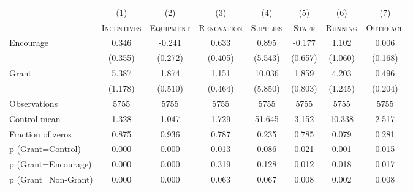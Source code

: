 \begin{tabular*}{\hsize}{@{\hskip\tabcolsep\extracolsep\fill}l*{7}{c}}
\toprule
                    &\multicolumn{1}{c}{(1)}&\multicolumn{1}{c}{(2)}&\multicolumn{1}{c}{(3)}&\multicolumn{1}{c}{(4)}&\multicolumn{1}{c}{(5)}&\multicolumn{1}{c}{(6)}&\multicolumn{1}{c}{(7)}\\
                    &\multicolumn{1}{c}{\textsc{Incentives}}&\multicolumn{1}{c}{\textsc{Equipment}}&\multicolumn{1}{c}{\textsc{Renovation}}&\multicolumn{1}{c}{\textsc{Supplies}}&\multicolumn{1}{c}{\textsc{Staff}}&\multicolumn{1}{c}{\textsc{Running}}&\multicolumn{1}{c}{\textsc{Outreach}}\\
\midrule
Encourage           &       0.346&      -0.241&       0.633&       0.895&      -0.177&       1.102&       0.006\\
                    &     (0.355)&     (0.272)&     (0.405)&     (5.543)&     (0.657)&     (1.060)&     (0.168)\\
\addlinespace
Grant               &       5.387&       1.874&       1.151&      10.036&       1.859&       4.203&       0.496\\
                    &     (1.178)&     (0.510)&     (0.464)&     (5.850)&     (0.803)&     (1.245)&     (0.204)\\
\midrule
Observations        &        5755&        5755&        5755&        5755&        5755&        5755&        5755\\
Control mean        &       1.328&       1.047&       1.729&      51.645&       3.152&      10.338&       2.517\\
Fraction of zeros   &       0.875&       0.936&       0.787&       0.235&       0.785&       0.079&       0.281\\
p (Grant=Control)   &       0.000&       0.000&       0.013&       0.086&       0.021&       0.001&       0.015\\
p (Grant=Encourage) &       0.000&       0.000&       0.319&       0.128&       0.012&       0.018&       0.017\\
p (Grant=Non-Grant) &       0.000&       0.000&       0.063&       0.067&       0.008&       0.002&       0.008\\
\bottomrule
\end{tabular*}

